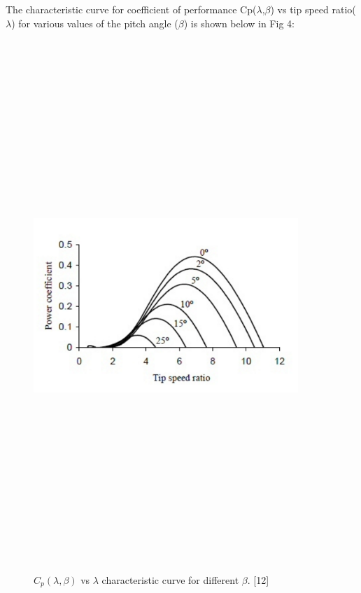 The characteristic curve for coefficient of  performance Cp($\lambda$,$\beta$) vs tip speed ratio($\lambda$) for various values of the pitch angle ($\beta$) is shown below in Fig 4:

\begin{center}
\begin{figure}
\includegraphics[width=10cm,height=20cm,keepaspectratio]{4.png}
\caption{$C_p(\lambda,\beta)$ vs $\lambda$ characteristic curve for different $\beta$. [12]}
\label{Fig:4}    
\end{figure}
\end{center}

